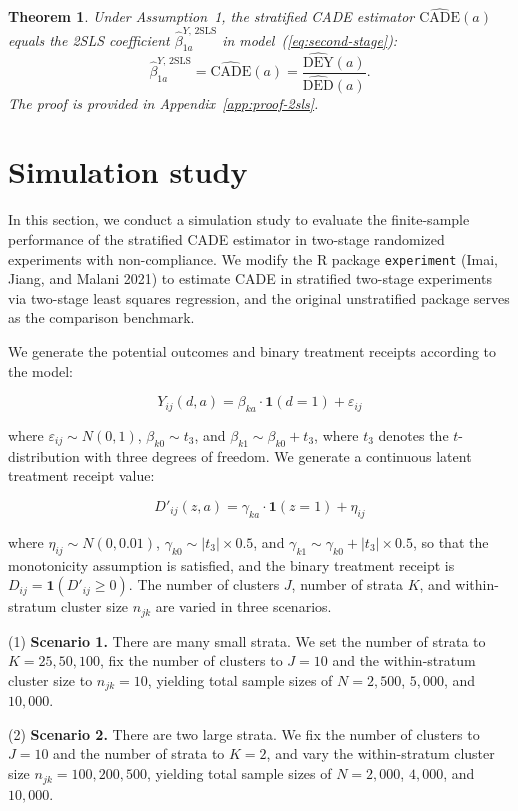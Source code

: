 \documentclass[a4paper, 12pt]{article}
\newtheorem{thm}{Theorem}
\begin{document}
\begin{thm}
Under Assumption~1, the stratified CADE estimator $\widehat{\mathrm{CADE}}(a)$ equals the 2SLS coefficient $\hat{\beta}^{Y,\,\mathrm{2SLS}}_{1a}$ in model~(\ref{eq:second-stage}):
$$
\hat{\beta}^{Y,\,\mathrm{2SLS}}_{1a} = \widehat{\mathrm{CADE}}(a) = \frac{\widehat{\mathrm{DEY}}(a)}{\widehat{\mathrm{DED}}(a)}.
$$
The proof is provided in Appendix~\ref{app:proof-2sls}.
\end{thm}

\section{Simulation study}

In this section, we conduct a simulation study to evaluate the finite-sample performance of the stratified CADE estimator in two-stage randomized experiments with non-compliance. We modify the R package \texttt{experiment} (Imai, Jiang, and Malani 2021) to estimate CADE in stratified two-stage experiments via two-stage least squares regression, and the original unstratified package serves as the comparison benchmark.

We generate the potential outcomes and binary treatment receipts according to the model:

$$Y_{ij}(d, a) = \beta_{ka} \cdot \mathbf{1}(d = 1) + \varepsilon_{ij}$$

where $\varepsilon_{ij} \sim N(0,1)$, $\beta_{k0} \sim t_3$, and $\beta_{k1} \sim \beta_{k0} + t_3$, where $t_3$ denotes the $t$-distribution with three degrees of freedom. We generate a continuous latent treatment receipt value:

$$D'_{ij}(z, a) = \gamma_{ka} \cdot \mathbf{1}(z = 1) + \eta_{ij}$$

where $\eta_{ij} \sim N(0, 0.01)$, $\gamma_{k0} \sim |t_3| \times 0.5$, and $\gamma_{k1} \sim \gamma_{k0} + |t_3| \times 0.5$, so that the monotonicity assumption is satisfied, and the binary treatment receipt is $D_{ij} = \mathbf{1}(D'_{ij} \geq 0)$. The number of clusters $J$, number of strata $K$, and within-stratum cluster size $n_{jk}$ are varied in three scenarios.

\medskip
\noindent (1) \textbf{Scenario 1.} There are many small strata. We set the number of strata to $K = 25, 50, 100$, fix the number of clusters to $J = 10$ and the within-stratum cluster size to $n_{jk} = 10$, yielding total sample sizes of $N = 2{,}500$, $5{,}000$, and $10{,}000$.

\medskip
\noindent (2) \textbf{Scenario 2.} There are two large strata. We fix the number of clusters to $J = 10$ and the number of strata to $K = 2$, and vary the within-stratum cluster size $n_{jk} = 100, 200, 500$, yielding total sample sizes of $N = 2{,}000$, $4{,}000$, and $10{,}000$.
\end{document}
